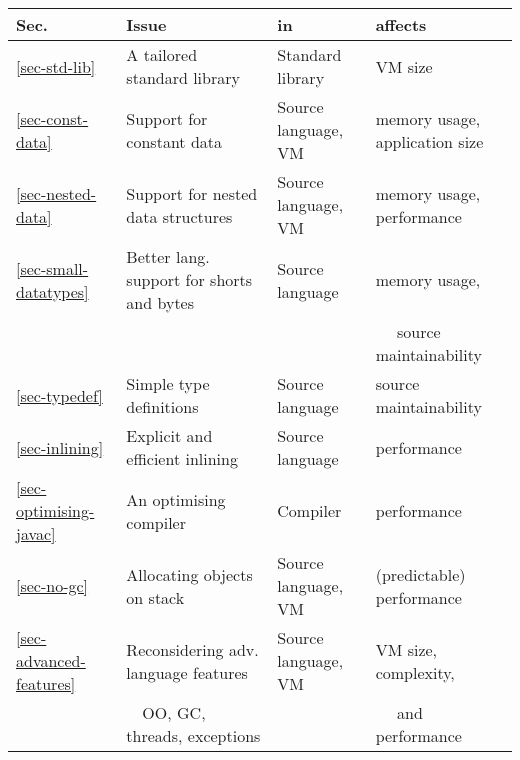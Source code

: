 \begin{tabular}{l|l|l|l}
\toprule
\bfseries Sec.              & \bfseries Issue                               & \bfseries in          & \bfseries affects \\
\midrule
\midrule
\ref{sec-std-lib}           & A tailored standard library                   & Standard library      & VM size \\
\ref{sec-const-data}        & Support for constant data                     & Source language, VM   & memory usage, application size \\
\ref{sec-nested-data}       & Support for nested data structures            & Source language, VM   & memory usage, performance \\
\ref{sec-small-datatypes}   & Better lang. support for shorts and bytes     & Source language       & memory usage, \\
                            &                                               &                       & ~~  source maintainability\\
\ref{sec-typedef}           & Simple type definitions                       & Source language       & source maintainability \\
\ref{sec-inlining}          & Explicit and efficient inlining               & Source language       & performance \\
\ref{sec-optimising-javac}  & An optimising compiler                        & Compiler              & performance \\
\ref{sec-no-gc}             & Allocating objects on stack                   & Source language, VM   & (predictable) performance \\
\ref{sec-advanced-features} & Reconsidering adv. language features          & Source language, VM   & VM size, complexity, \\
                            & ~~OO, GC, threads, exceptions                 &                       & ~~ and performance \\
\bottomrule
\end{tabular}

